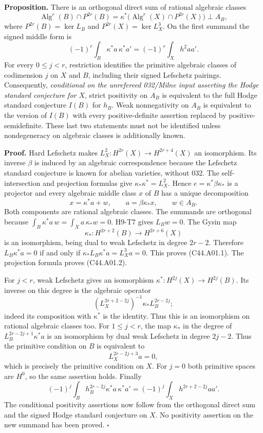 \documentclass[11pt]{article}
\theoremstyle{remark}\newtheorem{remark}[theorem]{Remark}
\begin{document}
\textbf{Proposition.}
There is an orthogonal direct sum of rational algebraic classes
\[
 \operatorname{Alg}^{r}(B)\cap P^{2r}(B)
 =\kappa^*\bigl(\operatorname{Alg}^{r}(X)\cap P^{2r}(X)\bigr)
       \mathbin{\perp} A_B,                                  \tag{C44.A01.1}
\]
where $P^{2r}(B)=\ker L_B$ and $P^{2r}(X)=\ker L_X^3$.
On the first summand the signed middle form is
\[
   (-1)^r\int_B\kappa^*a\,\kappa^*a'
       =(-1)^r\int_Xh^2aa'.                                 \tag{C44.A01.2}
\]
For every $0\le j<r$, restriction identifies the primitive algebraic
classes of codimension $j$ on $X$ and $B$, including their signed
Lefschetz pairings.
Consequently, \emph{conditional on the unrefereed 032/Milne input
asserting the Hodge standard conjecture for $X$}, strict positivity
on $A_B$ is equivalent to the full Hodge standard conjecture $I(B)$
for $h_B$. Weak nonnegativity on $A_B$ is equivalent to the version
of $I(B)$ with every positive-definite assertion replaced by
positive-semidefinite. These last two statements must not be
identified unless nondegeneracy on algebraic classes is additionally
known.

\textbf{Proof.}
Hard Lefschetz makes $L_X^2:H^{2r}(X)\longrightarrow H^{2r+4}(X)$
an isomorphism. Its inverse $\beta$ is induced by an algebraic
correspondence because the Lefschetz standard conjecture is known
for abelian varieties, without 032. The self-intersection and
projection formulas give
$\kappa_*\kappa^*=L_X^2$. Hence
$e=\kappa^*\beta\kappa_*$ is a projector and every algebraic middle
class $x$ of $B$ has a unique decomposition
\[
 x=\kappa^*a+w,\qquad a=\beta\kappa_*x,\qquad w\in A_B.       \tag{C44.A01.3}
\]
Both components are rational algebraic classes. The summands are
orthogonal because
$\int_B\kappa^*a\,w=\int_Xa\,\kappa_*w=0$.
H9-T7 gives $L_Bw=0$. The Gysin map
\[
 \kappa_*:H^{2r+2}(B)\longrightarrow H^{2r+6}(X)
\]
is an isomorphism, being dual to weak Lefschetz in degree $2r-2$.
Therefore $L_B\kappa^*a=0$ if and only if
$\kappa_*L_B\kappa^*a=L_X^3a=0$. This proves (C44.A01.1).
The projection formula proves (C44.A01.2).

For $j<r$, weak Lefschetz gives an isomorphism
$\kappa^*:H^{2j}(X)\longrightarrow H^{2j}(B)$.
Its inverse on this degree is the algebraic operator
\[
 (L_X^{2r+2-2j})^{-1}\kappa_*L_B^{2r-2j};                   \tag{C44.A01.4}
\]
indeed its composition with $\kappa^*$ is the identity.
Thus this is an isomorphism on rational algebraic classes too.
For $1\le j<r$, the map $\kappa_*$ in the degree of
$L_B^{2r-2j+1}\kappa^*a$ is an isomorphism by dual weak
Lefschetz in degree $2j-2$. Thus the primitive condition on $B$
is equivalent to
\[
 L_X^{2r-2j+3}a=0,
\]
which is precisely the primitive condition on $X$. For $j=0$
both primitive spaces are $H^0$, so the same assertion holds.
Finally
\[
 (-1)^j\int_B h_B^{2r-2j}\kappa^*a\,\kappa^*a'
 =(-1)^j\int_Xh^{2r+2-2j}aa'.
\]
The conditional positivity assertions now follow from the
orthogonal direct sum and the signed Hodge standard conjecture on
$X$. No positivity assertion on the new summand has been proved.
\hfill$\square$
\end{document}
